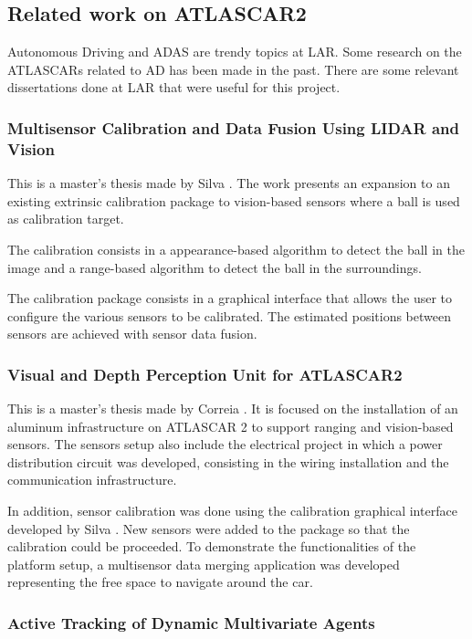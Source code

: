 \subsection{Related work on ATLASCAR2}

Autonomous Driving and ADAS are trendy topics at LAR. Some research on the ATLASCARs related to AD has been made in the past. There are some relevant dissertations done at LAR that were useful for this project. 

\subsubsection{Multisensor Calibration and Data Fusion Using LIDAR and Vision} 

This is a master's thesis made by Silva \cite{VieiradaSilva2016}. The work presents an expansion to an existing extrinsic calibration package to vision-based sensors where a ball is used as calibration target. 

The calibration consists in a appearance-based algorithm to detect the ball in the image and a range-based algorithm to detect the ball in the surroundings. 

The calibration package consists in a graphical interface that allows the user to configure the various sensors to be calibrated. The estimated positions between sensors are achieved with sensor data fusion.

\subsubsection{Visual and Depth Perception Unit for	ATLASCAR2} 

This is a master's thesis made by Correia \cite{Correia2017}. It is focused on the installation of an aluminum infrastructure on ATLASCAR 2 to support ranging and vision-based sensors. The sensors setup also include the electrical project in which a power distribution circuit was developed, consisting in the wiring installation and the communication infrastructure. 

In addition, sensor calibration was done using the calibration graphical interface developed by Silva \cite{VieiradaSilva2016}. New sensors were added to the package so that the calibration could be proceeded. To demonstrate the functionalities of the platform setup, a multisensor data merging application was developed representing the free space to navigate around the car.

\subsubsection{Active Tracking of Dynamic Multivariate Agents} 

